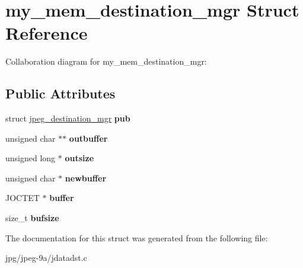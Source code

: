 \hypertarget{structmy__mem__destination__mgr}{\section{my\+\_\+mem\+\_\+destination\+\_\+mgr Struct Reference}
\label{structmy__mem__destination__mgr}
}


Collaboration diagram for my\+\_\+mem\+\_\+destination\+\_\+mgr\+:
\subsection*{Public Attributes}
\begin{DoxyCompactItemize}
\item 
\hypertarget{structmy__mem__destination__mgr_a5e0cd1a96147d183b7338007a7716961}{struct \hyperlink{structjpeg__destination__mgr}{jpeg\+\_\+destination\+\_\+mgr} {\bfseries pub}}\label{structmy__mem__destination__mgr_a5e0cd1a96147d183b7338007a7716961}

\item 
\hypertarget{structmy__mem__destination__mgr_a61dceebdaf153d422514527aa0e1bf6e}{unsigned char $\ast$$\ast$ {\bfseries outbuffer}}\label{structmy__mem__destination__mgr_a61dceebdaf153d422514527aa0e1bf6e}

\item 
\hypertarget{structmy__mem__destination__mgr_ac4bcefbee84e8b603a57dbb347cc2351}{unsigned long $\ast$ {\bfseries outsize}}\label{structmy__mem__destination__mgr_ac4bcefbee84e8b603a57dbb347cc2351}

\item 
\hypertarget{structmy__mem__destination__mgr_ac0b918872c851937dd8751d1a8105220}{unsigned char $\ast$ {\bfseries newbuffer}}\label{structmy__mem__destination__mgr_ac0b918872c851937dd8751d1a8105220}

\item 
\hypertarget{structmy__mem__destination__mgr_a183510a848f0a8d421a541df6ce6acac}{J\+O\+C\+T\+E\+T $\ast$ {\bfseries buffer}}\label{structmy__mem__destination__mgr_a183510a848f0a8d421a541df6ce6acac}

\item 
\hypertarget{structmy__mem__destination__mgr_a216685d583a991f4757f4e3f6a5de675}{size\+\_\+t {\bfseries bufsize}}\label{structmy__mem__destination__mgr_a216685d583a991f4757f4e3f6a5de675}

\end{DoxyCompactItemize}


The documentation for this struct was generated from the following file\+:\begin{DoxyCompactItemize}
\item 
jpg/jpeg-\/9a/jdatadst.\+c\end{DoxyCompactItemize}

